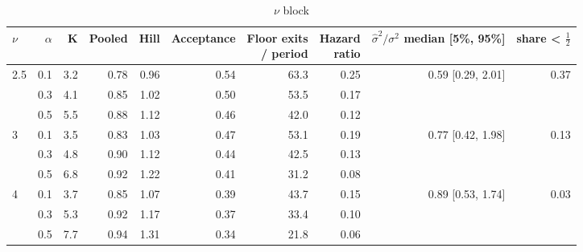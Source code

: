 \begin{table}
\centering
\caption{$\nu$ block}
\label{tab:a9_nu}
\small
\begin{tabular}{lrrrrrrrrr}
\toprule
$\nu$ & $\alpha$ & K & Pooled & Hill & Acceptance & \makecell[b]{Floor exits\\{}/ period} & \makecell[b]{Hazard\\{}ratio} & \makecell[b]{$\hat\sigma^2/\sigma^2$\\{}median [5\%, 95\%]} & \makecell[b]{share\\{}< $\tfrac12$} \\
\midrule
2.5 & 0.1 & 3.2 & 0.78 & 0.96 & 0.54 & 63.3 & 0.25 & 0.59 [0.29, 2.01] & 0.37 \\
 & 0.3 & 4.1 & 0.85 & 1.02 & 0.50 & 53.5 & 0.17 &  &  \\
 & 0.5 & 5.5 & 0.88 & 1.12 & 0.46 & 42.0 & 0.12 &  &  \\
3 & 0.1 & 3.5 & 0.83 & 1.03 & 0.47 & 53.1 & 0.19 & 0.77 [0.42, 1.98] & 0.13 \\
 & 0.3 & 4.8 & 0.90 & 1.12 & 0.44 & 42.5 & 0.13 &  &  \\
 & 0.5 & 6.8 & 0.92 & 1.22 & 0.41 & 31.2 & 0.08 &  &  \\
4 & 0.1 & 3.7 & 0.85 & 1.07 & 0.39 & 43.7 & 0.15 & 0.89 [0.53, 1.74] & 0.03 \\
 & 0.3 & 5.3 & 0.92 & 1.17 & 0.37 & 33.4 & 0.10 &  &  \\
 & 0.5 & 7.7 & 0.94 & 1.31 & 0.34 & 21.8 & 0.06 &  &  \\
\bottomrule
\end{tabular}
\end{table}
